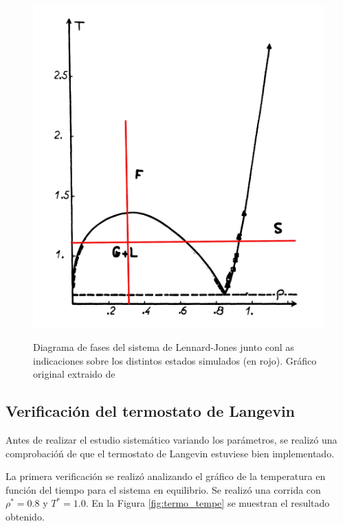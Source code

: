 \documentclass[a4paper,12pt]{article}
\begin{document}
\begin{figure}[H]
	\centering
	\includegraphics[scale=0.1]{fases.png} \\
	\caption{Diagrama de fases del sistema de Lennard-Jones junto conl as 
	indicaciones sobre los distintos estados simulados (en rojo). Gráfico 
	original extraido de \cite{hansenverlet1969}}\label{fig:fases}
\end{figure}

\subsection{Verificación del termostato de Langevin}

Antes de realizar el estudio sistemático variando los parámetros, se realizó 
una comprobacióń de que el termostato de Langevin estuviese bien implementado.

La primera verificación se realizó analizando el gráfico de la temperatura en 
función del tiempo para el sistema en equilibrio. Se realizó una corrida con 
$\rho^*=0.8$ y $T^*=1.0$. En la Figura \eqref{fig:termo_tempe} se muestran el 
resultado obtenido.
\end{document}
